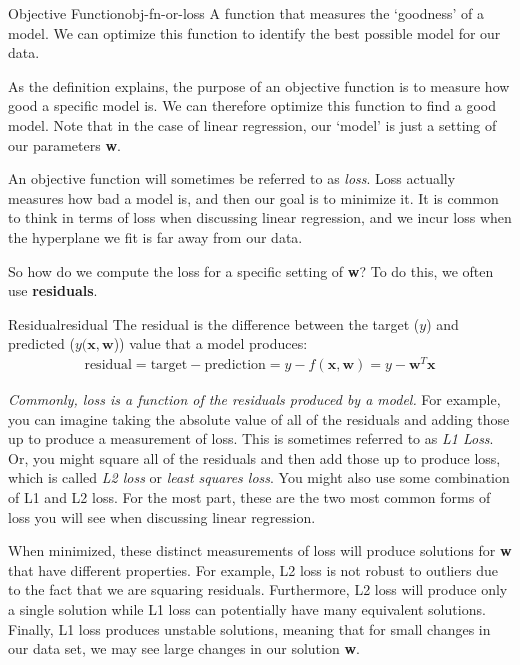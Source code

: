 \begin{definition}{Objective Function}{obj-fn-or-loss}
A function that measures the `goodness' of a model. We can optimize this function to identify the best possible model for our data.
\end{definition}

As the definition explains, the purpose of an objective function is to measure how good a specific model is. We can therefore optimize this function to find a good model. Note that in the case of linear regression, our `model' is just a setting of our parameters \textbf{w}.

An objective function will sometimes be referred to as \textit{loss}. Loss actually measures how bad a model is, and then our goal is to minimize it. It is common to think in terms of loss when discussing linear regression, and we incur loss when the hyperplane we fit is far away from our data.

So how do we compute the loss for a specific setting of \textbf{w}? To do this, we often use \textbf{residuals}.

\begin{definition}{Residual}{residual}
The residual is the difference between the target ($y$) and predicted ($y(\textbf{x}, \textbf{w}$)) value that a model produces:
\begin{align*}
    \text{residual} = \text{target} - \text{prediction} = y - f(\textbf{x}, \textbf{w}) = \boxed{y - \textbf{w}^{T}\textbf{x}}
\end{align*}
\end{definition}

\textit{Commonly, loss is a function of the residuals produced by a model.} For example, you can imagine taking the absolute value of all of the residuals and adding those up to produce a measurement of loss. This is sometimes referred to as \textit{L1 Loss}. Or, you might square all of the residuals and then add those up to produce loss, which is called \textit{L2 loss} or \textit{least squares loss}. You might also use some combination of L1 and L2 loss. For the most part, these are the two most common forms of loss you will see when discussing linear regression.

When minimized, these distinct measurements of loss will produce solutions for \textbf{w} that have different properties. For example, L2 loss is not robust to outliers due to the fact that we are squaring residuals. Furthermore, L2 loss will produce only a single solution while L1 loss can potentially have many equivalent solutions. Finally, L1 loss produces unstable solutions, meaning that for small changes in our data set, we may see large changes in our solution \textbf{w}.

